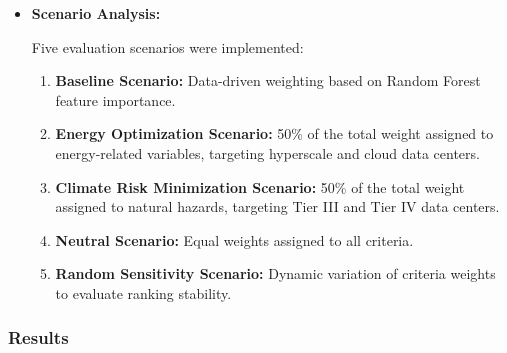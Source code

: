 \begin{itemize}
    where:

    \begin{itemize}
        \item $S_i$ is the suitability score of location $i$.
        \item $w_j$ is the weight assigned to criterion $j$.
        \item $x_{ij}$ is the normalized value of criterion $j$ at location $i$.
        \item $n$ is the number of criteria.
    \end{itemize}

    \item \textbf{Scenario Analysis:}

    Five evaluation scenarios were implemented:

    \begin{enumerate}
        \item \textbf{Baseline Scenario:}
        Data-driven weighting based on Random Forest feature importance.

        \item \textbf{Energy Optimization Scenario:}
        50\% of the total weight assigned to energy-related variables, targeting hyperscale and cloud data centers.

        \item \textbf{Climate Risk Minimization Scenario:}
        50\% of the total weight assigned to natural hazards, targeting Tier III and Tier IV data centers.

        \item \textbf{Neutral Scenario:}
        Equal weights assigned to all criteria.

        \item \textbf{Random Sensitivity Scenario:}
        Dynamic variation of criteria weights to evaluate ranking stability.
    \end{enumerate}

\end{itemize}

\subsubsection{Results}

